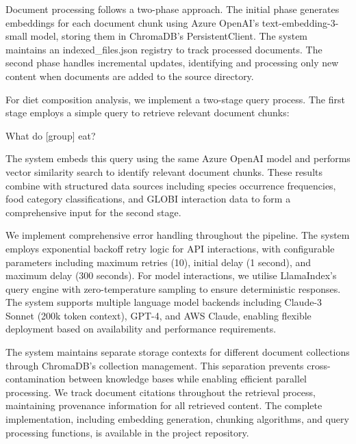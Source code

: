   Document processing follows a two-phase approach. The initial phase generates embeddings for each document chunk using Azure OpenAI's text-embedding-3-small model, storing them in ChromaDB's PersistentClient. The system maintains an indexed\_files.json registry to track processed documents. The second phase handles incremental updates, identifying and processing only new content when documents are added to the source directory.
  
  For diet composition analysis, we implement a two-stage query process. The first stage employs a simple query to retrieve relevant document chunks:
  
  \begin{prompt}
  What do [group] eat?
  \end{prompt}
  
  The system embeds this query using the same Azure OpenAI model and performs vector similarity search to identify relevant document chunks. These results combine with structured data sources including species occurrence frequencies, food category classifications, and GLOBI interaction data to form a comprehensive input for the second stage.
  
  We implement comprehensive error handling throughout the pipeline. The system employs exponential backoff retry logic for API interactions, with configurable parameters including maximum retries (10), initial delay (1 second), and maximum delay (300 seconds). For model interactions, we utilise LlamaIndex's query engine with zero-temperature sampling to ensure deterministic responses. The system supports multiple language model backends including Claude-3 Sonnet (200k token context), GPT-4, and AWS Claude, enabling flexible deployment based on availability and performance requirements.
  
  The system maintains separate storage contexts for different document collections through ChromaDB's collection management. This separation prevents cross-contamination between knowledge bases while enabling efficient parallel processing. We track document citations throughout the retrieval process, maintaining provenance information for all retrieved content. The complete implementation, including embedding generation, chunking algorithms, and query processing functions, is available in the project repository.
